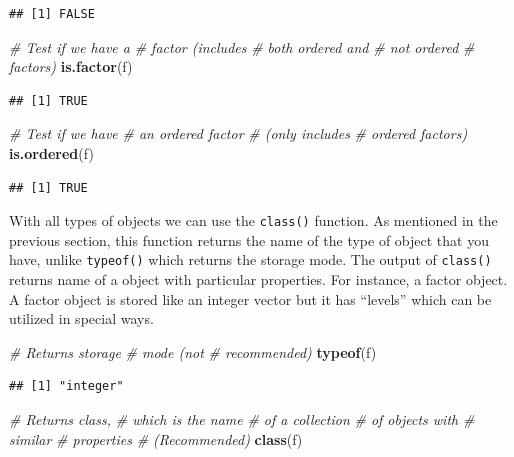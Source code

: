 \documentclass[
]{book}
\newenvironment{Shaded}{\begin{snugshade}}{\end{snugshade}}
\newcommand{\CommentTok}[1]{\textcolor[rgb]{0.56,0.35,0.01}{\textit{#1}}}
\newcommand{\KeywordTok}[1]{\textcolor[rgb]{0.13,0.29,0.53}{\textbf{#1}}}
\newcommand{\NormalTok}[1]{#1}
\begin{document}
\begin{verbatim}
## [1] FALSE
\end{verbatim}

\begin{Shaded}
\begin{Highlighting}[]
\CommentTok{# Test if we have a}
\CommentTok{# factor (includes}
\CommentTok{# both ordered and}
\CommentTok{# not ordered}
\CommentTok{# factors)}
\KeywordTok{is.factor}\NormalTok{(f)}
\end{Highlighting}
\end{Shaded}

\begin{verbatim}
## [1] TRUE
\end{verbatim}

\begin{Shaded}
\begin{Highlighting}[]
\CommentTok{# Test if we have}
\CommentTok{# an ordered factor}
\CommentTok{# (only includes}
\CommentTok{# ordered factors)}
\KeywordTok{is.ordered}\NormalTok{(f)}
\end{Highlighting}
\end{Shaded}

\begin{verbatim}
## [1] TRUE
\end{verbatim}

With all types of objects we can use the \texttt{class()} function. As mentioned in the previous section, this function returns the name of the type of object that you have, unlike \texttt{typeof()} which returns the storage mode. The output of \texttt{class()} returns name of a object with particular properties. For instance, a factor object. A factor object is stored like an integer vector but it has ``levels'' which can be utilized in special ways.

\begin{Shaded}
\begin{Highlighting}[]
\CommentTok{# Returns storage}
\CommentTok{# mode (not}
\CommentTok{# recommended)}
\KeywordTok{typeof}\NormalTok{(f)}
\end{Highlighting}
\end{Shaded}

\begin{verbatim}
## [1] "integer"
\end{verbatim}

\begin{Shaded}
\begin{Highlighting}[]
\CommentTok{# Returns class,}
\CommentTok{# which is the name}
\CommentTok{# of a collection}
\CommentTok{# of objects with}
\CommentTok{# similar}
\CommentTok{# properties}
\CommentTok{# (Recommended)}
\KeywordTok{class}\NormalTok{(f)}
\end{Highlighting}
\end{Shaded}
\end{document}
